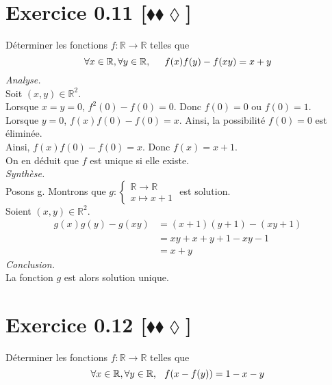 \documentclass[10pt]{article}
\begin{document}
\section*{Exercice 0.11 [$\blacklozenge\blacklozenge\lozenge$]}
\begin{tcolorbox}[enhanced, width=6in, center, size=fbox, fontupper=\large, drop shadow southwest]
    Déterminer les fonctions $f: \mathbb{R} \rightarrow \mathbb{R}$ telles que 
    \begin{equation*}
        \forall{x\in\mathbb{R},\forall{y\in\mathbb{R}}, \hspace{0.5cm} f(x)f(y) - f(xy) = x + y}
    \end{equation*}
    \emph{Analyse.}\\
    Soit $(x,y)\in\mathbb{R}^2$.\\
    Lorsque $x=y=0$, $f^2(0)-f(0)=0$. Donc $f(0) = 0$ ou $f(0) = 1$.\\
    Lorsque $y=0$, $f(x)f(0)-f(0)=x$. Ainsi, la possibilité $f(0)=0$ est éliminée.\\
    Ainsi, $f(x)f(0)-f(0)=x$. Donc $f(x)=x+1$.\\
    On en déduit que $f$ est unique si elle existe.\\ 
    \emph{Synthèse.}\\
    Posons g. Montrons que $g : \begin{cases}\mathbb{R}\rightarrow\mathbb{R}\\x\mapsto{x+1}\end{cases}$ est solution.\\
    Soient $(x,y)\in\mathbb{R}^2$.
    \begin{align*}
        g(x)g(y)-g(xy)
        &=(x+1)(y+1)-(xy+1)\\
        &=xy+x+y+1-xy-1\\
        &=x+y
    \end{align*}
    \emph{Conclusion.}\\
    La fonction $g$ est alors solution unique.
\end{tcolorbox}

\section*{Exercice 0.12 [$\blacklozenge\blacklozenge\lozenge$]}
\begin{tcolorbox}[enhanced, width=6in, center, size=fbox, fontupper=\large, drop shadow southwest]
    Déterminer les fonctions $f: \mathbb{R} \rightarrow \mathbb{R}$ telles que 
    \begin{equation*}
        \forall{x\in\mathbb{R}},\forall{y\in\mathbb{R}}, \hspace{0.25cm} f(x-f(y)) = 1-x-y
    \end{equation*}
\end{tcolorbox}
\end{document}
